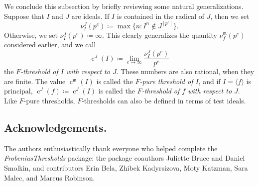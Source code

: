 \documentclass{amsart}
\newcommand{\ft}{\operatorname{c}}
\newcommand{\idealm}{\mathfrak{m}}
\begin{document}
We conclude this subsection by briefly reviewing some natural generalizations.  Suppose that $I$ and $J$ are ideals.  If $I$ is contained in the radical of $J$, then we set
%
\[ \nu_I^J(p^e) \coloneqq \max \{ n : I^n \notin J^{[p^e]} \}. \]
Otherwise, we set $\nu_I^J(p^e) \coloneqq \infty$.
This clearly generalizes the quantity $\nu_f^{\idealm}(p^e)$ considered earlier, and we call
\[ \ft^J(I) \coloneqq  \lim_{e \to \infty} \frac{ \nu_I^J(p^e)}{p^e} \]
the \emph{$F$-threshold of $I$ with respect to $J$}.  These numbers are also rational, when they are finite.
The value $\ft^{\idealm}(I)$ is called the \emph{$F$-pure threshold of $I$}, and if $I = \langle f \rangle$ is principal,  $\ft^{J}(f) \coloneqq  \ft^J(I)$ is called the \emph{$F$-threshold of $f$ with respect to $J$}.
Like $F$-pure thresholds, $F$-thresholds can also be defined in terms of test ideals.




\subsection*{Acknowledgements.}  The authors enthusiastically thank everyone who helped complete the \emph{FrobeniusThresholds} package: the package coauthors Juliette Bruce and Daniel Smolkin, and contributors  Erin Bela, Zhibek Kadyrsizova, Moty Katzman, Sara Malec, and Marcus Robinson.
\end{document}
